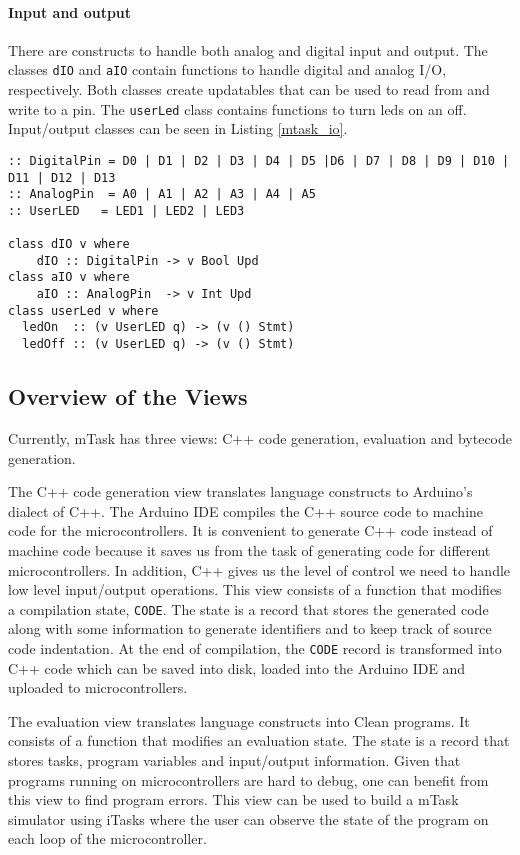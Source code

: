 \paragraph{Input and output} There are constructs to handle both analog and digital input and output. The classes \texttt{dIO} and \texttt{aIO} contain functions to handle digital and analog I/O, respectively. Both classes create updatables that can be used to read from and write to a pin. The \texttt{userLed} class contains functions to turn \acsp{led} on an off. Input/output classes can be seen in Listing \ref{mtask_io}. 

\begin{lstlisting}[caption=mTask I/O classes,captionpos=b,label=mtask_io]
:: DigitalPin = D0 | D1 | D2 | D3 | D4 | D5 |D6 | D7 | D8 | D9 | D10 | D11 | D12 | D13
:: AnalogPin  = A0 | A1 | A2 | A3 | A4 | A5
:: UserLED   = LED1 | LED2 | LED3

class dIO v where
	dIO :: DigitalPin -> v Bool Upd
class aIO v where
	aIO :: AnalogPin  -> v Int Upd
class userLed v where
  ledOn  :: (v UserLED q) -> (v () Stmt)
  ledOff :: (v UserLED q) -> (v () Stmt)
\end{lstlisting}


\subsection{Overview of the Views}\label{sec:mtask_views}

Currently, mTask has three views: C++ code generation, evaluation and bytecode generation.

The C++ code generation view translates language constructs to Arduino's dialect of C++. The Arduino IDE compiles the C++ source code to machine code for the microcontrollers. 
It is convenient to generate C++ code instead of machine code because it saves us from the task of generating code for different microcontrollers. In addition, C++ gives us the level of control we need to handle low level input/output operations. This view consists of a function that modifies a compilation state, \texttt{CODE}. The state is a record that stores the generated code along with some information to generate identifiers and to keep track of source code indentation. At the end of compilation, the \texttt{CODE} record is transformed into C++ code which can be saved into disk, loaded into the Arduino IDE and uploaded to microcontrollers.


The evaluation view translates language constructs into Clean programs. It consists of a function that modifies an evaluation state. The state is a record that stores tasks, program variables and input/output information. Given that programs running on microcontrollers are hard to debug, one can benefit from this view to find program errors. This view can be used to build a mTask simulator using iTasks where the user can observe the state of the program on each loop of the microcontroller.

